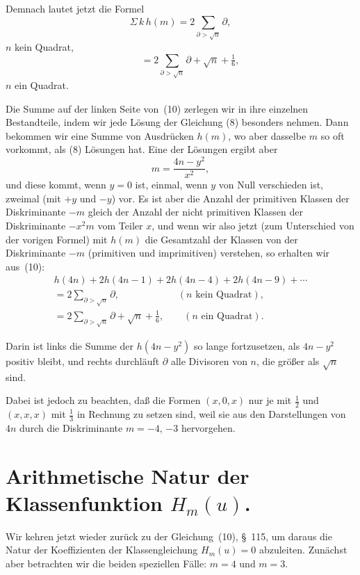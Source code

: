 \documentclass[12pt,a4paper]{article}
\theoremstyle{weber}
\begin{document}
\newpage

Demnach lautet jetzt die Formel
\begin{equation}
\Sigma\,k\,h(m) = 2\sum_{\partial > \sqrt{n}} \partial,
\end{equation}
$n$ kein Quadrat,
\[
\qquad = 2\sum_{\partial > \sqrt{n}} \partial + \sqrt{n} + \tfrac{1}{6},
\]
$n$ ein Quadrat.

Die Summe auf der linken Seite von~(10) zerlegen wir in ihre einzelnen Bestandteile, indem wir jede Lösung der Gleichung (8) besonders nehmen. Dann bekommen wir eine Summe von Ausdrücken $h(m)$, wo aber dasselbe $m$ so oft vorkommt, als (8) Lösungen hat. Eine der Lösungen ergibt aber
\[
m = \frac{4n - y^2}{x^2},
\]
und diese kommt, wenn $y = 0$ ist, einmal, wenn $y$ von Null verschieden ist, zweimal (mit $+y$ und $-y$) vor. Es ist aber die Anzahl der primitiven Klassen der Diskriminante $-m$ gleich der Anzahl der nicht primitiven Klassen der Diskriminante $-x^2 m$ vom Teiler $x$, und wenn wir also jetzt (zum Unterschied von der vorigen Formel) mit $h(m)$ die Gesamtzahl der Klassen von der Diskriminante $-m$ (primitiven und imprimitiven) verstehen, so erhalten wir aus~(10):
\begin{multline}
h(4n) + 2h(4n-1) + 2h(4n-4) + 2h(4n-9) + \cdots\\
= 2\sum_{\partial > \sqrt{n}} \partial, \qquad\qquad\qquad (n\text{ kein Quadrat}),\\
= 2\sum_{\partial > \sqrt{n}} \partial + \sqrt{n} + \tfrac{1}{6}, \qquad (n\text{ ein Quadrat}).
\end{multline}

Darin ist links die Summe der $h(4n - y^2)$ so lange fortzusetzen, als $4n - y^2$ positiv bleibt, und rechts durchläuft $\partial$ alle Divisoren von $n$, die größer als $\sqrt{n}$ sind.

Dabei ist jedoch zu beachten, daß die Formen $(x, 0, x)$ nur je mit $\tfrac{1}{2}$ und $(x, x, x)$ mit $\tfrac{1}{3}$ in Rechnung zu setzen sind, weil sie aus den Darstellungen von $4n$ durch die Diskriminante $m = -4$, $-3$ hervorgehen.


\newpage
\section{Arithmetische Natur der Klassen\-funk\-tion $H_m(u)$.}

Wir kehren jetzt wieder zurück zu der Gleichung~(10), \S~115, um daraus die Natur der Koeffizienten der Klassengleichung $H_m(u) = 0$ abzuleiten. Zunächst aber betrachten wir die beiden speziellen Fälle: $m = 4$ und $m = 3$.
\end{document}
